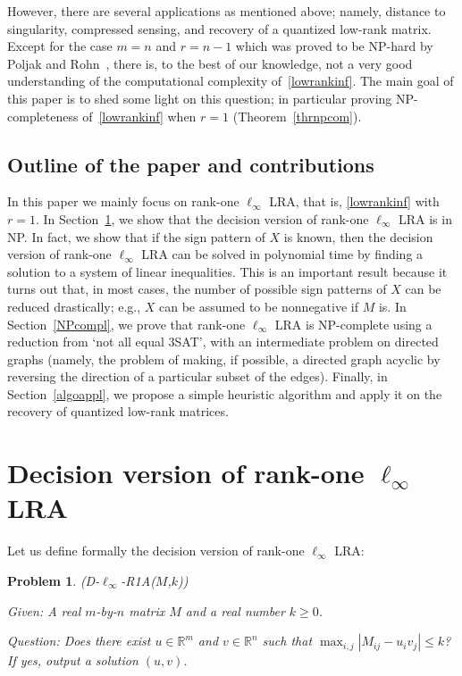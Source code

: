 \documentclass[a4paper,11pt]{article}
\newtheorem{problem}{Problem}
\numberwithin{equation}{section}
\begin{document}
However, there are several applications as mentioned above; namely, distance to singularity, compressed sensing, and recovery of a quantized low-rank matrix. 
Except for the case $m=n$ and $r = n-1$ which was proved to be NP-hard by Poljak and Rohn~\cite{PR93}, there is, to the best of our knowledge, not a very good understanding of the computational complexity of~\eqref{lowrankinf}. 
The main goal of this paper is to shed some light on this question; in particular proving NP-completeness of~\eqref{lowrankinf} when $r=1$ (Theorem~\ref{thrnpcom}).  



\subsection{Outline of the paper and contributions}

In this paper we mainly focus on rank-one $\ell_{\infty}$ LRA, that is, \eqref{lowrankinf} with $r=1$. 
In Section~\ref{pblinNP}, we show that the decision version of rank-one $\ell_{\infty}$ LRA is in NP. 
In fact, we show that if the sign pattern of $X$ is known, then the decision version of rank-one $\ell_{\infty}$ LRA can be solved in polynomial time by finding a solution to a system of linear inequalities. 
This is an important result because it turns out that, in most cases, the number of possible sign patterns of $X$ can be reduced drastically;  e.g., $X$ can be assumed to be nonnegative if $M$ is. 
In Section~\ref{NPcompl}, we prove that rank-one $\ell_{\infty}$ LRA is NP-complete using a reduction from `not all equal 3SAT', 
with an intermediate problem on directed graphs (namely, the problem of making, if possible, a directed graph acyclic by reversing the direction of a particular subset of the edges). 
Finally, in Section~\ref{algoappl}, we propose a simple heuristic algorithm and apply it on the recovery of quantized low-rank matrices. 



\section{Decision version of rank-one $\ell_{\infty}$ LRA}  \label{pblinNP}

Let us define formally the decision version of rank-one $\ell_{\infty}$ LRA:
  
  \begin{problem} \label{probDellinf} (D-$\ell_\infty$-R1A($M$,$k$)) 
  
\noindent Given: A real $m$-by-$n$ matrix $M$ and a real number $k \geq 0$. 

\noindent Question:  Does there exist $u \in \mathbb{R}^{m}$ and $v  \in \mathbb{R}^{n}$ such that $\max_{i,j} |M_{ij} - u_i v_j| \leq k$? 
If yes, output a solution $(u,v)$.  
\end{problem}
\end{document}
